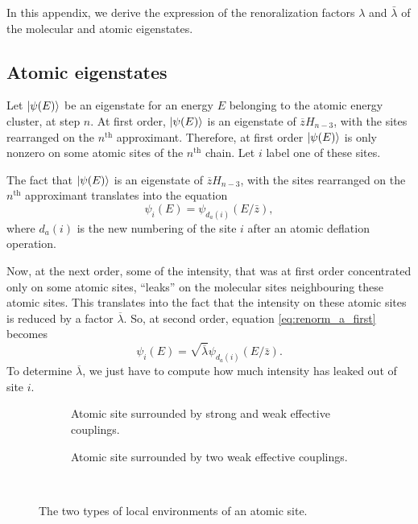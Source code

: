 \documentclass[11pt]{article}
\newcommand{\lb}{\ensuremath{\overline{\lambda}}}
\newcommand{\zb}{\ensuremath{\overline{z}}}
\begin{document}
In this appendix, we derive the expression of the renoralization factors $\lambda$ and $\bar \lambda$ of the molecular and atomic eigenstates.

\subsection{Atomic eigenstates}

Let $\ket{\psi(E)}$ be an eigenstate for an energy $E$ belonging to the atomic energy cluster, at step $n$.
At first order, $\ket{\psi(E)}$ is an eigenstate of $\zb H_{n-3}$, with the sites rearranged on the $n^\text{th}$ approximant.
Therefore, at first order $\ket{\psi(E)}$ is only nonzero on some atomic sites of the $n^\text{th}$ chain. Let $i$ label one of these sites.

The fact that $\ket{\psi(E)}$ is an eigenstate of $\zb H_{n-3}$, with the sites rearranged on the $n^\text{th}$ approximant translates into the equation
\begin{equation}
\label{eq:renorm_a_first}
	\psi_i(E) = \psi_{d_a(i)}(E/\bar z),
\end{equation}
where $d_a(i)$ is the new numbering of the site $i$ after an atomic deflation operation.

Now, at the next order, some of the intensity, that was at first order concentrated only on some atomic sites, ``leaks'' on the molecular sites neighbouring these atomic sites. 
This translates into the fact that the intensity on these atomic sites is reduced by a factor $\lb$.
So, at second order, equation \eqref{eq:renorm_a_first} becomes
\begin{equation}
\label{eq:renorm_a}
	\psi_i(E) = \sqrt{\lb} \psi_{d_a(i)}(E/\bar z).
\end{equation}
To determine $\lb$, we just have to compute how much intensity has leaked out of site $i$.

\begin{figure}[htp]

\centering
\begin{subfigure}{.5\textwidth}
  \centering
  
  \caption{Atomic site surrounded by strong and weak effective couplings.}
  \label{fig:atom1}
\end{subfigure}%
\begin{subfigure}{.5\textwidth}
  \centering
  
  \caption{Atomic site surrounded by two weak effective couplings.}
  \label{fig:atom2}
\end{subfigure} \\

\caption{The two types of local environments of an atomic site. }
\label{fig:energyconf1}
\end{figure}
\end{document}

